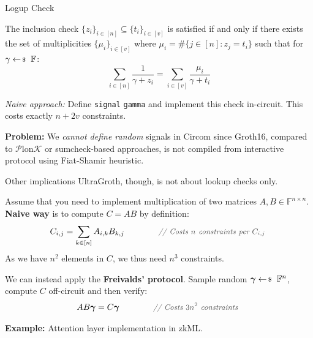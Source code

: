 \documentclass{zkdl-presentation-template}
\begin{document}
    \begin{frame}{Logup Check}
        \begin{theorem}
            The inclusion check $\{z_i\}_{i \in [n]} \subseteq \{t_i\}_{i \in
            [v]}$ is satisfied if and only if there exists the set of
            multiplicities $\{\mu_i\}_{i \in [v]}$ where $\mu_i = \#\{j \in [n]:
            z_j = t_i\}$ such that for $\gamma \leftarrowS \mathbb{F}$:
            \begin{equation*}
                \sum_{i \in [n]} \frac{1}{\gamma + z_i} = \sum_{i \in [v]} \frac{\mu_i}{\gamma + t_i}
            \end{equation*}
        \end{theorem}

        \pause\textit{Naive approach:} Define \texttt{\textcolor{oc-pink-7}{signal}} \texttt{gamma} and implement this check
        in-circuit. This costs exactly $n + 2v$ constraints.\pause

        \textcolor{oc-red-8}{\textbf{Problem:}} We \textit{cannot define
        random} signals in Circom since Groth16, compared to
        $\mathcal{P}$lon$\mathcal{K}$ or sumcheck-based approaches, is not
        compiled from interactive protocol using Fiat-Shamir heuristic.
    \end{frame}

    \begin{frame}{Other implications}
        UltraGroth, though, is not about lookup checks only.\pause

        Assume that you need to implement multiplication of two matrices $A,B
        \in \mathbb{F}^{n \times n}$. \textbf{Naive way} is to compute $C=AB$ by definition:\pause
        \begin{equation*}
            C_{i,j} = \sum_{k \in [n]} A_{i,k}B_{k,j} \hspace{30px} \text{\commentgray{Costs $n$ constraints per $C_{i,j}$}}
        \end{equation*}
        As we have $n^2$ elements in $C$, we thus need $n^3$ constraints.\pause

        We can instead apply the \textbf{Freivalds' protocol}. Sample random
        $\boldsymbol{\gamma} \leftarrowS \mathbb{F}^n$, compute $C$ off-circuit
        and then verify:
        \begin{equation*}
            AB\boldsymbol{\gamma} = C\boldsymbol{\gamma} \hspace{30px} \text{\commentgray{Costs $3n^2$ constraints}}
        \end{equation*}

        \textbf{Example:} Attention layer implementation in zkML.
    \end{frame}
\end{document}
